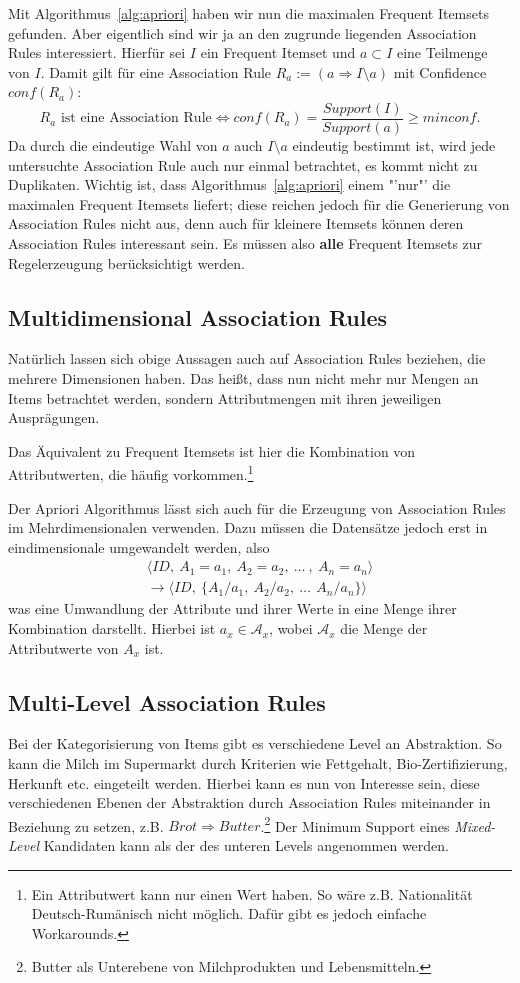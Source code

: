 Mit Algorithmus~\ref{alg:apriori} haben wir nun die maximalen Frequent Itemsets
gefunden. Aber eigentlich sind wir ja an den zugrunde liegenden Association Rules
interessiert. Hierfür sei \(I\) ein Frequent Itemset und \(a \subset I\) eine
Teilmenge von \(I\). Damit gilt für eine Association Rule 
\(R_a := (a \Rightarrow I\setminus a) \) mit 
Confidence \(conf(R_a)\):
\[
	R_a \text{ ist eine Association Rule} \Longleftrightarrow conf(R_a) = 
	\frac{Support(I)}{Support(a)} \geq minconf.
\]
Da durch die eindeutige Wahl von \(a\) auch \(I\setminus a\) eindeutig bestimmt
ist, wird jede untersuchte Association Rule auch nur einmal betrachtet, es kommt
nicht zu Duplikaten. Wichtig ist, dass Algorithmus~\ref{alg:apriori} einem "'nur"'
die maximalen Frequent Itemsets liefert; diese reichen jedoch für die Generierung
von Association Rules nicht aus, denn auch für kleinere Itemsets können deren
Association Rules interessant sein. Es müssen also \textbf{alle} Frequent Itemsets
zur Regelerzeugung berücksichtigt werden.

\subsection{Multidimensional Association Rules}
Natürlich lassen sich obige Aussagen auch auf Association Rules beziehen, die
mehrere Dimensionen haben. Das heißt, dass nun nicht mehr nur Mengen an Items
betrachtet werden, sondern Attributmengen mit ihren jeweiligen Ausprägungen.

Das Äquivalent zu Frequent Itemsets ist hier die Kombination von Attributwerten,
die häufig vorkommen.\footnote{Ein Attributwert kann nur einen Wert haben. So wäre 
z.B. Nationalität Deutsch-Rumänisch nicht möglich. Dafür gibt es jedoch 
einfache Workarounds.}

Der Apriori Algorithmus lässt sich auch für die Erzeugung von Association Rules
im Mehrdimensionalen verwenden. Dazu müssen die Datensätze jedoch erst in
eindimensionale umgewandelt werden, also
\begin{eqnarray*}
	\langle ID,\ A_1=a_{1},\ A_2=a_{2},\ \dots\ ,\ A_n=a_{n}\rangle \\
	\longrightarrow \langle ID,\ \{A_1/a_1,\ A_2/a_2,\ \dots\,\ A_n/a_n\}\rangle
\end{eqnarray*}
was eine Umwandlung der Attribute und ihrer Werte in eine Menge ihrer Kombination darstellt.
Hierbei ist \(a_x \in \mathcal{A}_x\), wobei \(\mathcal{A}_x\) die
Menge der Attributwerte von \(A_x\) ist.

\subsection{Multi-Level Association Rules}
Bei der Kategorisierung von Items gibt es verschiedene Level an Abstraktion. So
kann die Milch im Supermarkt durch Kriterien wie Fettgehalt, Bio-Zertifizierung,
Herkunft etc. eingeteilt werden. Hierbei kann es nun von Interesse sein, diese 
verschiedenen Ebenen der Abstraktion durch Association Rules miteinander in 
Beziehung zu setzen, z.B. \(Brot \Rightarrow Butter\).\footnote{Butter als
Unterebene von Milchprodukten und Lebensmitteln.} Der Minimum Support eines
\textit{Mixed-Level} Kandidaten kann als der des unteren Levels angenommen werden.

